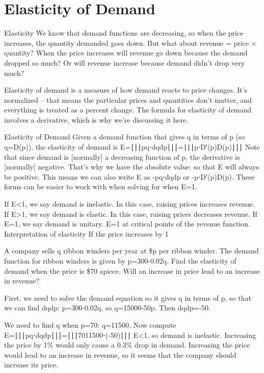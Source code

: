 \section{Elasticity of Demand}
\label{sec:demand}

Elasticity
We know that demand functions are decreasing, so when the price increases, the quantity demanded goes down. But what about revenue = price × quantity? When the price increases will revenue go down because the demand dropped so much? Or will revenue increase because demand didn't drop very much?

Elasticity of demand is a measure of how demand reacts to price changes. It’s normalized – that means the particular prices and quantities don't matter, and everything is treated as a percent change. The formula for elasticity of demand involves a derivative, which is why we’re discussing it here.



Elasticity of Demand
Given a demand function that gives q in terms of p (so q=D(p)), the elasticity of demand is
E=∣∣∣pq⋅dqdp∣∣∣=∣∣∣p⋅D′(p)D(p)∣∣∣
Note that since demand is [normally] a decreasing function of p, the derivative is [normally] negative. That's why we have the absolute value: so that E will always be positive. This means we can also write E as -pq⋅dqdp or -p⋅D′(p)D(p). These forms can be easier to work with when solving for when E=1.

If E<1, we say demand is inelastic. In this case, raising prices increases revenue.
If E>1, we say demand is elastic. In this case, raising prices decreases revenue.
If E=1, we say demand is unitary. E=1 at critical points of the revenue function.
Interpretation of elasticity
If the price increases by 1%

\begin{example}
A company sells q ribbon winders per year at \$p per ribbon winder. The demand function for ribbon winders is given by p=300-0.02q. Find the elasticity of demand when the price is \$70 apiece. Will an increase in price lead to an increase in revenue?

\begin{solution} First, we need to solve the demand equation so it gives q in terms of p, so that we can find dqdp: p=300-0.02q, so q=15000-50p. Then dqdp=-50.

We need to find q when p=70:
q=11500.
Now compute
E=∣∣∣pq⋅dqdp∣∣∣=∣∣∣7011500⋅(-50)∣∣∣
E<1, so demand is inelastic. Increasing the price by 1\% would only cause a 0.3\% drop in demand. Increasing the price would lead to an increase in revenue, so it seems that the company should increase its price.
\end{solution}\end{example}


